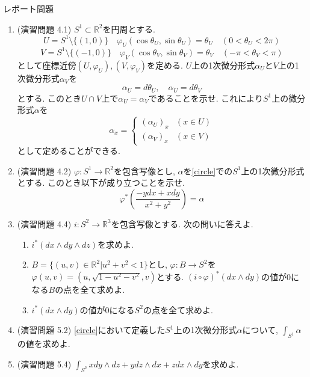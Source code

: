 \documentclass[dvipdfmx,a4paper,11pt]{article}
\newcommand{\R}{\mathbb{R}}
\theoremstyle{definition}
\begin{document}
\begin{flushleft}
{\Large レポート問題}
\end{flushleft}
\begin{enumerate}[label=\textbf{問題}\arabic*]

\item (演習問題 4.1) 
\label{circle}  $S^1 \subset \R^2$を円周とする. 
$$
U = S^1 \setminus \{(1,0)\} \quad \varphi_U(\cos\theta_U , \sin \theta_U) =\theta_U \quad (0 < \theta_U < 2\pi)
$$
$$
V= S^1 \setminus \{(-1,0)\} \quad \varphi_V(\cos\theta_V, \sin \theta_V) =\theta_V \quad (-\pi < \theta_V < \pi)
$$
として座標近傍$(U, \varphi_U), (V, \varphi_V)$を定める.
$U$上の1次微分形式$\alpha_U$と$V$上の1次微分形式$\alpha_V$を
$$
\alpha_U = d \theta_U, \quad \alpha_U = d \theta_V 
$$
とする. %
このとき$U \cap V$上で$\alpha_U = \alpha_V$であることを示せ. 
これにより$S^1$上の微分形式$\alpha$を
$$
\alpha_x = \left\{
\begin{array}{ll}
(\alpha_U)_x  & (x \in  U)\\
(\alpha_V)_x & (x \in V)
\end{array}
\right.
$$
として定めることができる. 
	
\item (演習問題 4.2) 
$\varphi: S^1 \to \R^2$を包含写像とし, $\alpha$を\ref{circle}での$S^1$上の1次微分形式とする. このとき以下が成り立つことを示せ. 
$$
\varphi^{*}\left( \frac{-ydx + x dy}{x^2+y^2} \right) = \alpha
$$

\item (演習問題 4.4) 
$i : S^2 \rightarrow \R^3$を包含写像とする. 次の問いに答えよ.
\begin{enumerate}
 \setlength{\parskip}{0cm}
  \setlength{\itemsep}{2pt} 
\item $i^{*}(dx \wedge dy \wedge dz)$を求めよ.
\item $B = \{ (u,v) \in \R^2 | u^2 + v^2 < 1\}$とし, $\varphi : B \to S^2$を$\varphi(u,v)= (u, \sqrt{1 - u^2 - v^2}, v)$とする. $(i \circ \varphi)^{*}(dx \wedge dy)$の値が0になる$B$の点を全て求めよ. 
\item $i^{*}(dx \wedge dy)$の値が0になる$S^2$の点を全て求めよ.
\end{enumerate}

\item (演習問題 5.2) 
\ref{circle}において定義した$S^1$上の1次微分形式$\alpha$について, $\int_{S^1 } \alpha$の値を求めよ.


\item (演習問題 5.4) 
$\int_{S^2} x dy \wedge dz + y dz \wedge dx + z dx \wedge dy$を求めよ. 


 \end{enumerate}

 
\end{document}
